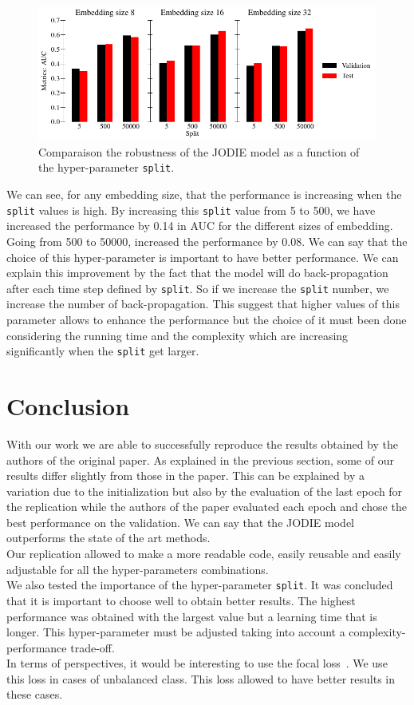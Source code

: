\begin{figure}[H]
    \centering
    \includegraphics[width = \textwidth]{image/split.pdf}
    \caption{Comparaison the robustness of the JODIE model as a function of the hyper-parameter \texttt{split}.}
    \label{split}
\end{figure}

We can see, for any embedding size, that the performance is increasing when the \texttt{split} values is high. By increasing this \texttt{split} value from 5 to 500, we have increased the performance by 0.14 in AUC for the different sizes of embedding. Going from 500 to 50000, increased the performance by 0.08. We can say that the choice of this hyper-parameter is important to have better performance. We can explain this improvement by the fact that the model will do back-propagation after each time step defined by \texttt{split}. So if we increase the \texttt{split} number, we increase the number of back-propagation. This suggest that higher values of this parameter allows to enhance the performance but the choice of it must been done considering the running time and the complexity which are increasing significantly when the \texttt{split} get larger.

\section*{Conclusion}
With our work we are able to successfully reproduce the results obtained by the authors of the original paper. As explained in the previous section, some of our results differ slightly from those in the paper. This can be explained by a variation due to the initialization but also by the evaluation of the last epoch for the replication while the authors of the paper evaluated each epoch and chose the best performance on the validation. We can say that the JODIE model outperforms the state of the art methods.\\
Our replication allowed to make a more readable code, easily reusable and easily adjustable for all the hyper-parameters combinations.\\
We also tested the importance of the hyper-parameter \texttt{split}. It was concluded that it is important to choose well to obtain better results. The highest performance was obtained with the largest value but a learning time that is longer. This hyper-parameter must be adjusted taking into account a complexity-performance trade-off.\\
In terms of perspectives, it would be interesting to use the focal loss~\cite{https://doi.org/10.48550/arxiv.1708.02002}. We use this loss in cases of unbalanced class. This loss allowed to have better results in these cases.